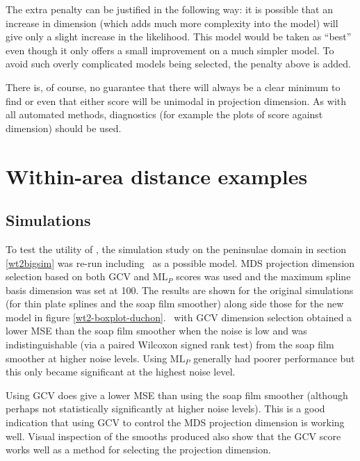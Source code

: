 The extra penalty can be justified in the following way: it is possible that an increase in dimension (which adds much more complexity into the model) will give only a slight increase in the likelihood. This model would be taken as ``best'' even though it only offers a small improvement on a much simpler model. To avoid such overly complicated models being selected, the penalty above is added.

There is, of course, no guarantee that there will always be a clear minimum to find or even that either score will be unimodal in projection dimension. As with all automated methods, diagnostics (for example the plots of score against dimension) should be used.

\section{Within-area distance examples}
\label{gds-wad-examples}
\subsection{Simulations}

To test the utility of \mdsds, the simulation study on the peninsulae domain in section \ref{wt2bigsim} was re-run including \mdsds\ as a possible model. MDS projection dimension selection based on both GCV and $\text{ML}_P$ scores was used and the maximum spline basis dimension was set at 100. The results are shown for the original simulations (for thin plate splines and the soap film smoother) along side those for the new model in figure \ref{wt2-boxplot-duchon}. \mdsds\ with GCV dimension selection obtained a lower MSE than the soap film smoother when the noise is low and was indistinguishable (via a paired Wilcoxon signed rank test) from the soap film smoother at higher noise levels. Using $\text{ML}_P$ generally had poorer performance but this only became significant at the highest noise level.

Using GCV does give a lower MSE than using the soap film smoother (although perhaps not statistically significantly at higher noise levels). This is a good indication that using GCV to control the MDS projection dimension is working well. Visual inspection of the smooths produced also show that the GCV score works well as a method for selecting the projection dimension.

